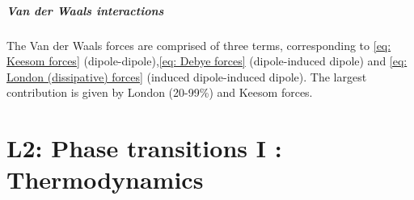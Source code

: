 \documentclass[../phys-f308.tex]{subfiles}
\begin{document}
    \subsubsection{Van der Waals interactions}

    The Van der Waals forces are comprised of three terms, corresponding to \eqref{eq: Keesom forces} (dipole-dipole),\eqref{eq: Debye forces} (dipole-induced dipole) and \eqref{eq: London (dissipative) forces} (induced dipole-induced dipole). The largest contribution is given by London (20-99\%) and Keesom forces.

    \part{L2: Phase transitions I : Thermodynamics}
\end{document}
